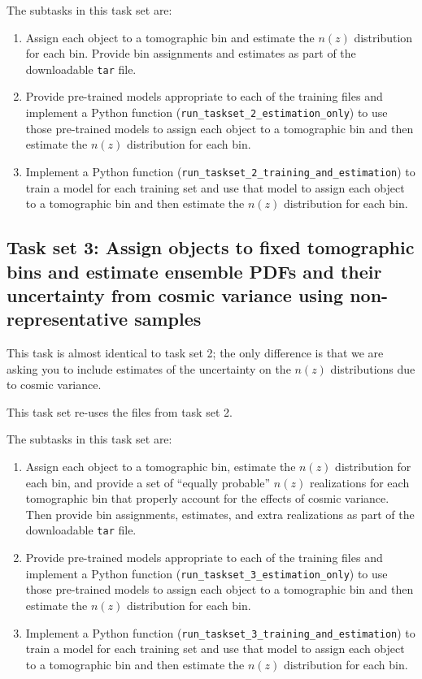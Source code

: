 \documentclass[11pt,twoside,letterpaper,onecolumn,english]{article}
\begin{document}
The subtasks in this task set are:

\begin{enumerate}
  \item{Assign each object to a tomographic bin and estimate the $n(z)$ distribution for each bin.
      Provide bin assignments and estimates as part of the downloadable \texttt{tar} file.}
  \item{Provide pre-trained models appropriate to each of the training
      files and implement a Python function (\texttt{run\_taskset\_2\_estimation\_only}) to use those
      pre-trained models to assign each object to a tomographic bin and then estimate the $n(z)$
      distribution for each bin.}
  \item{Implement a Python function (\texttt{run\_taskset\_2\_training\_and\_estimation}) to train a model for
      each training set and use that model to assign each object to a tomographic bin and then estimate the $n(z)$
      distribution for each bin.}
\end{enumerate}
  

\subsection{Task set 3: Assign objects to fixed tomographic bins
  and estimate ensemble PDFs and their uncertainty from cosmic variance
  using non-representative samples}

This task is almost identical to task set 2; the only difference is that we are asking you to include estimates
of the uncertainty on the $n(z)$ distributions due to cosmic variance.

This task set re-uses the files from task set 2.

The subtasks in this task set are:

\begin{enumerate}
\item{Assign each object to a tomographic bin, estimate the $n(z)$ distribution for each bin, and provide
    a set of ``equally probable'' $n(z)$ realizations for each tomographic bin that properly account for the effects of
    cosmic variance.  Then provide bin assignments, estimates, and extra realizations as part of the downloadable \texttt{tar} file.}
  \item{Provide pre-trained models appropriate to each of the training
      files and implement a Python function (\texttt{run\_taskset\_3\_estimation\_only}) to use those
      pre-trained models to assign each object to a tomographic bin and then estimate the $n(z)$
      distribution for each bin.}
  \item{Implement a Python function (\texttt{run\_taskset\_3\_training\_and\_estimation}) to train a model for
      each training set and use that model to assign each object to a tomographic bin and then estimate the $n(z)$
      distribution for each bin.}
\end{enumerate}
\end{document}

